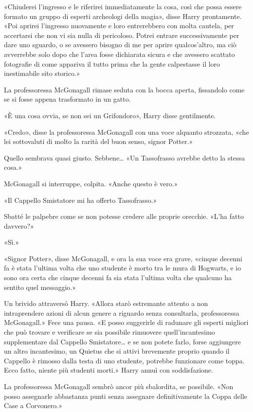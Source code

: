 «Chiuderei l’ingresso e le riferirei immediatamente la cosa, così che possa essere formato un gruppo di esperti archeologi della magia», disse Harry prontamente. «Poi aprirei l’ingresso nuovamente e loro entrerebbero con molta cautela, per accertarsi che non vi sia nulla di pericoloso. Potrei entrare successivamente per dare uno sguardo, o se avessero bisogno di me per aprire qualcos’altro, ma ciò avverrebbe solo dopo che l’area fosse dichiarata sicura e che avessero scattato fotografie di come appariva il tutto prima che la gente calpestasse il loro inestimabile sito storico.»

La professoressa McGonagall rimase seduta con la bocca aperta, fissandolo come se si fosse appena trasformato in un gatto.

«È una cosa ovvia, se non sei un Grifondoro», Harry disse gentilmente.

«Credo», disse la professoressa McGonagall con una voce alquanto strozzata, «che lei sottovaluti di molto la rarità del buon senso, signor Potter.»

Quello sembrava quasi giusto. Sebbene… «Un Tassofrasso avrebbe detto la stessa cosa.»

McGonagall si interruppe, colpita. «Anche questo è vero.»

«Il Cappello Smistatore mi ha offerto Tassofrasso.»

Sbatté le palpebre come se non potesse credere alle proprie orecchie. «L’ha fatto davvero?»

«Sì.»

«Signor Potter», disse McGonagall, e ora la sua voce era grave, «cinque decenni fa è stata l’ultima volta che uno studente è morto tra le mura di Hogwarts, e io sono ora certa che cinque decenni fa sia stata l’ultima volta che qualcuno ha sentito quel messaggio.»

Un brivido attraversò Harry. «Allora starò estremante attento a non intraprendere azioni di alcun genere a riguardo senza consultarla, professoressa McGonagall.» Fece una pausa. «E posso suggerirle di radunare gli esperti migliori che può trovare e verificare se sia possibile rimuovere quell’incantesimo supplementare dal Cappello Smistatore… e se non potete farlo, forse aggiungere un altro incantesimo, un Quietus che si attivi brevemente proprio quando il Cappello è rimosso dalla testa di uno studente, potrebbe funzionare come toppa. Ecco fatto, niente più studenti morti.» Harry annuì con soddisfazione.

La professoressa McGonagall sembrò ancor più sbalordita, se possibile. «Non posso assegnarle abbastanza punti senza assegnare definitivamente la Coppa delle Case a Corvonero.»

